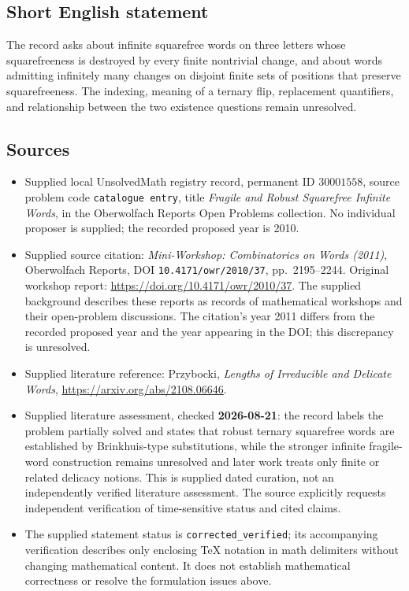 \documentclass[11pt]{article}
\begin{document}
\subsection{Short English statement}
The record asks about infinite squarefree words on three letters whose squarefreeness is destroyed by every finite nontrivial change, and about words admitting infinitely many changes on disjoint finite sets of positions that preserve squarefreeness. The indexing, meaning of a ternary flip, replacement quantifiers, and relationship between the two existence questions remain unresolved.
\subsection{Sources}
\begin{itemize}
\item Supplied local UnsolvedMath registry record, permanent ID \(30001558\), source problem code \texttt{catalogue entry}, title \emph{Fragile and Robust Squarefree Infinite Words}, in the Oberwolfach Reports Open Problems collection. No individual proposer is supplied; the recorded proposed year is 2010.
\item Supplied source citation: \emph{Mini-Workshop: Combinatorics on Words (2011)}, Oberwolfach Reports, DOI \texttt{10.4171/owr/2010/37}, pp.\ 2195--2244. Original workshop report: \url{https://doi.org/10.4171/owr/2010/37}. The supplied background describes these reports as records of mathematical workshops and their open-problem discussions. The citation's year 2011 differs from the recorded proposed year and the year appearing in the DOI; this discrepancy is unresolved.
\item Supplied literature reference: Przybocki, \emph{Lengths of Irreducible and Delicate Words}, \url{https://arxiv.org/abs/2108.06646}.
\item Supplied literature assessment, checked \textbf{2026-08-21}: the record labels the problem partially solved and states that robust ternary squarefree words are established by Brinkhuis-type substitutions, while the stronger infinite fragile-word construction remains unresolved and later work treats only finite or related delicacy notions. This is supplied dated curation, not an independently verified literature assessment. The source explicitly requests independent verification of time-sensitive status and cited claims.
\item The supplied statement status is \texttt{corrected\_verified}; its accompanying verification describes only enclosing TeX notation in math delimiters without changing mathematical content. It does not establish mathematical correctness or resolve the formulation issues above.
\end{itemize}
\end{document}
